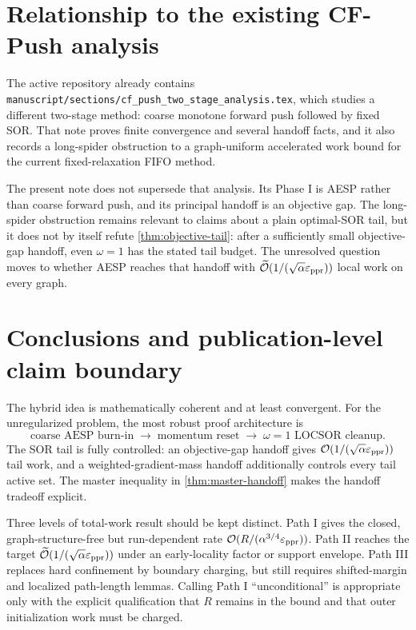 \section{Relationship to the existing CF-Push analysis}
\label{sec:cf-relation}

The active repository already contains
\texttt{manuscript/sections/cf\_push\_two\_stage\_analysis.tex}, which studies a
different two-stage method: coarse monotone forward push followed by fixed
SOR. That note proves finite convergence and several handoff facts, and it
also records a long-spider obstruction to a graph-uniform accelerated work
bound for the current fixed-relaxation FIFO method.

The present note does not supersede that analysis. Its Phase I is AESP rather
than coarse forward push, and its principal handoff is an objective gap. The
long-spider obstruction remains relevant to claims about a plain optimal-SOR
tail, but it does not by itself refute \cref{thm:objective-tail}: after a
sufficiently small objective-gap handoff, even $\omega=1$ has the stated tail
budget. The unresolved question moves to whether AESP reaches that handoff
with $\widetilde{\mathcal{O}}(1/(\sqrt\alpha\varepsilon_{\mathrm{ppr}}))$ local work on every graph.

\section{Conclusions and publication-level claim boundary}
\label{sec:conclusion}

The hybrid idea is mathematically coherent and at least convergent. For the
unregularized problem, the most robust proof architecture is
\[
  \boxed{
  \text{coarse AESP burn-in}
  \;\longrightarrow\;
  \text{momentum reset}
  \;\longrightarrow\;
  \omega=1\text{ LOCSOR cleanup}.}
\]
The SOR tail is fully controlled: an objective-gap handoff gives
$\mathcal{O}(1/(\sqrt\alpha\varepsilon_{\mathrm{ppr}}))$ tail work, and a weighted-gradient-mass handoff
additionally controls every tail active set. The master inequality in
\cref{thm:master-handoff} makes the handoff tradeoff explicit.

Three levels of total-work result should be kept distinct. Path I gives the
closed, graph-structure-free but run-dependent rate
$\mathcal{O}(R/(\alpha^{3/4}\varepsilon_{\mathrm{ppr}}))$. Path II reaches the target
$\widetilde{\mathcal{O}}(1/(\sqrt\alpha\varepsilon_{\mathrm{ppr}}))$ under an early-locality factor or support
envelope. Path III replaces hard confinement by boundary charging, but still
requires shifted-margin and localized path-length lemmas. Calling Path I
``unconditional'' is appropriate only with the explicit qualification that
$R$ remains in the bound and that outer initialization work must be charged.


